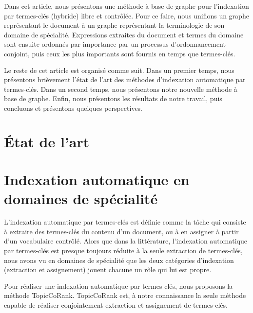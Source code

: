   Dans cet article, nous présentons une méthode à base de graphe pour
  l'indexation par termes-clés (hybride) libre et contrôlée. Pour ce faire, nous
  unifions un graphe représentant le document à un graphe représentant la
  terminologie de son domaine de spécialité. Expressions extraites du document
  et termes du domaine sont ensuite ordonnés par importance par un processus
  d'ordonnancement conjoint, puis ceux les plus importants sont fournis en temps
  que termes-clés.

  Le reste de cet article est organisé comme suit. Dans un premier temps, nous
  présentons brièvement l'état de l'art des méthodes d'indexation automatique
  par termes-clés. Dans un second temps, nous présentons notre nouvelle méthode
  à base de graphe. Enfin, nous présentons les résultats de notre travail, puis
  concluons et présentons quelques perspectives.


\section{État de l'art}
\label{sec:main-domain_specific_keyphrase_annotation-state_of_the_art}



\section{Indexation automatique en domaines de spécialité}
\label{sec:main-domain_specific_keyphrase_annotation-supervised_automatic_keyphrase_extraction}
  L'indexation automatique par termes-clés est définie comme la tâche qui
  consiste à extraire des termes-clés du contenu d'un document, ou à en
  assigner à partir d'un vocabulaire contrôlé. Alors que dans la
  littérature, l'indexation automatique par termes-clés est presque toujours réduite à la
  seule extraction de termes-clés, nous avons vu en domaines de spécialité
  que les deux catégories d'indexation (extraction et assignement) jouent
  chacune un rôle qui lui est propre.

  Pour réaliser une indexation automatique par termes-clés, nous proposons la
  méthode TopicCoRank. TopicCoRank est, à notre connaissance la seule méthode
  capable de réaliser conjointement extraction et assignement de termes-clés.

